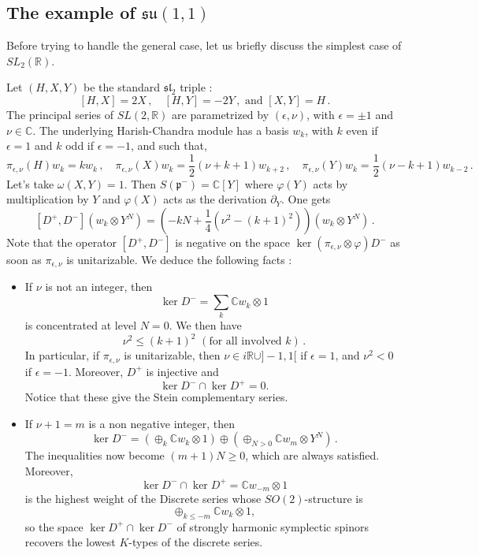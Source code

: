 \documentclass{amsart}[draft,11pt]
\numberwithin{equation}{section}
\theoremstyle{definition}
\begin{document}
\subsection{The example of $\mathfrak{su}(1,1)$}
Before trying to handle the general case, let us briefly discuss the simplest case of $SL_2(\mathbb{R})$.

Let $(H,X,Y)$ be the standard $\mathfrak{sl}_2$ triple :
$$ [H,X]=2X\,,\quad [H,Y]=-2Y\,,\text{ and } [X,Y]=H\,.$$
The principal series of $SL(2,\mathbb{R})$ are 
parametrized by $(\epsilon,\nu)$, with $\epsilon=\pm 1$ and $\nu\in\mathbb{C}$.
The underlying Harish-Chandra module has a basis $w_k$, with $k$ even if $\epsilon=1$ and
$k$ odd if $\epsilon=-1$, and such that, 
\begin{equation*}
    \pi_{\epsilon,\nu}(H)w_k=kw_k\,,\quad
    \pi_{\epsilon,\nu}(X)w_k=\frac12(\nu+k+1)w_{k+2}\,,\quad
    \pi_{\epsilon,\nu}(Y)w_k=\frac12(\nu-k+1)w_{k-2}\,.
\end{equation*}
Let's take $\omega(X,Y)=1$. Then $S(\mathfrak{p}^-)=\mathbb{C}[Y]$ where
$\varphi(Y)$ acts by multiplication by $Y$
and $\varphi(X)$ acts as the derivation $\partial_Y$.
One gets
$$
[D^+,D^-](w_k\otimes Y^N)=
\left( -kN+\frac14(\nu^2-(k+1)^2)\right)(w_k\otimes Y^N)\,.
$$
Note that the operator $[D^+,D^-]$ is negative on the space $\ker (\pi_{\epsilon,\nu}\otimes \varphi)D^-$ as soon as $\pi_{\epsilon,\nu}$ is unitarizable.
We deduce the following facts :
\begin{itemize}
    \item 
If $\nu$ is not an integer, then 
$$\ker D^-=\sum_{k}\mathbb{C}w_k\otimes 1$$
is concentrated at level $N=0$.
We then have
$$ \nu^2 \leq (k+1)^2 \,\,(\text{for all  involved }k)\,.$$
In particular, if $\pi_{\epsilon,\nu}$ is unitarizable, then $\nu \in i\mathbb{R}\cup ]-1,1[$ if $\epsilon=1$, and $\nu^2<0$ if $\epsilon = -1$.
Moreover, $D^+$ is injective and 
$$\ker D^- \cap \ker D^+ = 0.$$
Notice that these give the Stein complementary series.
    \item
If $\nu+1=m$ is a non negative integer, then
$$
\ker D^-=
\left( \oplus_k \mathbb{C}w_k\otimes 1 \right) \oplus
\left( \oplus_{N>0} \mathbb{C} w_m\otimes Y^N \right)\,.
$$
The inequalities now become $(m+1)N\geq 0$, which are always satisfied.
Moreover, 
$$\ker D^- \cap \ker D^+ = \mathbb{C}w_{-m}\otimes 1$$ 
is the highest weight of the Discrete series whose $SO(2)$-structure is
$$\oplus_{k\leq -m}\mathbb{C}w_k\otimes 1,$$ 
so the space $\ker D^+\cap \ker D^-$ of strongly harmonic symplectic spinors recovers the lowest $K$-types of the discrete series.
\end{itemize}
\end{document}
